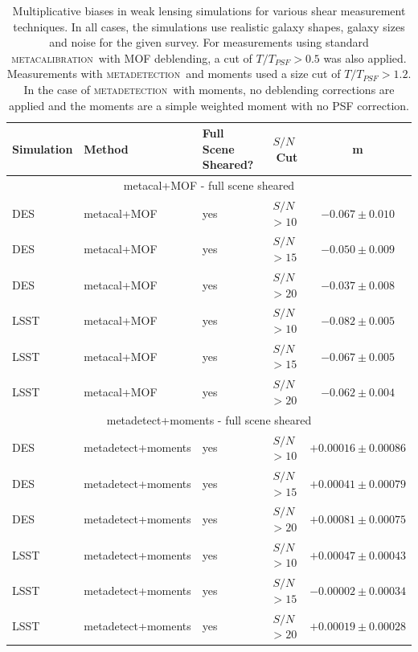\documentclass[fleqn,useAMS,usenatbib]{mnras}
\newcommand{\snr}{$S/N$}
\newcommand{\mcal}{\textsc{metacalibration}}
\newcommand{\mdet}{\textsc{metadetection}}
\begin{document}


\begin{table}
  \centering
  \caption{
    Multiplicative biases in weak lensing simulations for various shear
    measurement techniques. In all cases, the simulations use realistic
    galaxy shapes, galaxy sizes and noise for the given survey. For measurements using standard \mcal\ with
    MOF deblending, a cut of $T/T_{PSF} > 0.5$ was also applied. Measurements with
    \mdet\ and moments used a size cut of $T/T_{PSF} > 1.2$. In the case of \mdet\ with moments,
    no deblending corrections are applied and the moments are a simple weighted moment
    with no PSF correction.}
  \label{tab:shearmeas}

  \begin{tabular}{|l|l|l|c|c|}
    \hline
    Simulation & Method & Full Scene Sheared? & \snr\ Cut & m \\
    \hline

    \hline
    \multicolumn{5}{c}{metacal+MOF - full scene sheared}\\
    \hline
    DES   & metacal+MOF & yes & \snr$ > 10$ & $-0.067 \pm 0.010$  \\
    DES   & metacal+MOF & yes & \snr$ > 15$ & $-0.050 \pm 0.009$  \\
    DES   & metacal+MOF & yes & \snr$ > 20$ & $-0.037 \pm 0.008$  \\
    \hline
    LSST  & metacal+MOF & yes & \snr$ > 10$ & $-0.082 \pm 0.005$  \\
    LSST  & metacal+MOF & yes & \snr$ > 15$ & $-0.067 \pm 0.005$  \\
    LSST  & metacal+MOF & yes & \snr$ > 20$ & $-0.062 \pm 0.004$  \\
    \hline

    \hline
    \multicolumn{5}{c}{metadetect+moments - full scene sheared}\\
    \hline
    DES   & metadetect+moments & yes & \snr$ > 10$ & $+0.00016 \pm 0.00086$  \\
    DES   & metadetect+moments & yes & \snr$ > 15$ & $+0.00041 \pm 0.00079$  \\
    DES   & metadetect+moments & yes & \snr$ > 20$ & $+0.00081 \pm 0.00075$  \\
    \hline
    LSST  & metadetect+moments & yes & \snr$ > 10$ & $+0.00047 \pm 0.00043$  \\
    LSST  & metadetect+moments & yes & \snr$ > 15$ & $-0.00002 \pm 0.00034$  \\
    LSST  & metadetect+moments & yes & \snr$ > 20$ & $+0.00019 \pm 0.00028$  \\
    \hline


\end{tabular}
\end{table}
\end{document}
